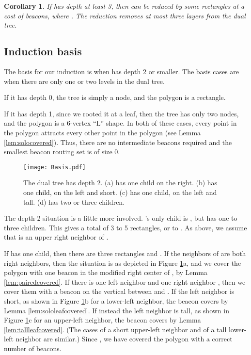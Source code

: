 \documentclass{article}
\newtheorem{cor}[thm]{Corollary}
\begin{document}
		\begin{cor}\label{cor:casescondensed}
			If  has depth at least 3, then  can be reduced by some 
			rectangles at a cost of  beacons, where .
			The reduction removes at most three layers from the dual tree.
		\end{cor}
		
	\subsection{Induction basis}
		The basis for our induction is when  has depth 2 or smaller.
				The basis cases are when there are only one or two levels in the dual tree.
				
		If it has depth 0,
		the tree is simply a node, and 
		the polygon is a rectangle.
		
		If it has depth 1,
		since we rooted it at a leaf, then the tree has only two nodes, and
		the polygon is a 6-vertex ``L'' shape.
		In both of these cases, every point in the polygon attracts every other point
		in the polygon (see Lemma \ref{lem:solocovered}).  Thus, there are no intermediate
		beacons required and the smallest beacon routing set is of size 0.
		\begin{figure}[htbp] 
			\begin{center}
				\texttt{[image: Basis.pdf]} 
			\end{center}
			\caption{ The dual tree has depth 2. 
					(a)  has one child on the right.
					(b)  has one child, on the left and short.
					(c)  has one child, on the left and tall.
					(d)  has two or three children.
					}
			\label{fig:basis}
		\end{figure}  
		The depth-2 situation is a little more involved.  's only child is ,
		but  has one to three children.  This gives a total of 3 to 5
		rectangles, or  to .  As above, we assume that  is an upper
		right neighbor of .
		
		If  has one child, then there are three rectangles and .
		If the neighbors of  are both right neighbors, then the situation is
		as depicted in Figure \ref{fig:basis}a, and we
		cover the polygon with one beacon in the modified right center of , by
		Lemma \ref{lem:pairedcovered}. 
		If there is one left neighbor  and one right neighbor , then we cover
		them with a beacon  on the vertical between  and .
		If the left neighbor is short, as shown in Figure \ref{fig:basis}b for a
		lower-left neighbor, the beacon  covers  by Lemma
		\ref{lem:sololeafcovered}.
		If instead the left neighbor is tall, as shown in Figure \ref{fig:basis}c for
		an upper-left neighbor, the beacon  covers  by Lemma
		\ref{lem:tallleafcovered}.
		(The cases of a short upper-left neighbor and of a tall lower-left neighbor
		are similar.)  Since , we have covered the
		polygon with a correct number of beacons.
		
\end{document}
